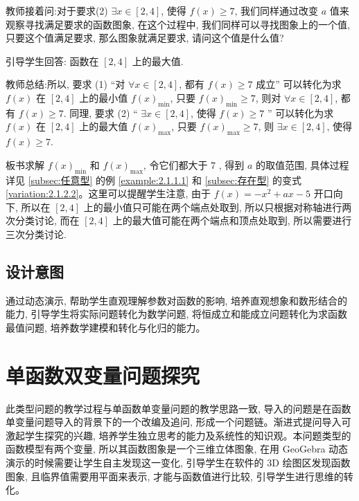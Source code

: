 教师接着问:对于要求(2) \(\exists x \in  \left\lbrack  {2, 4}\right\rbrack\), 使得 \(f(x)  \geq  7\), 我们同样通过改变 \(a\) 值来观察寻找满足要求的函数图象, 在这个过程中, 我们同样可以寻找图象上的一个值, 只要这个值满足要求, 那么图象就满足要求, 请问这个值是什么值?

引导学生回答: 函数在 \(\left\lbrack  {2, 4}\right\rbrack\) 上的最大值.

教师总结:所以, 要求 (1) “对 \(\forall x \in  \left\lbrack  {2, 4}\right\rbrack\), 都有 \(f(x)  \geq  7\) 成立” 可以转化为求 \(f(x)\) 在 \(\left\lbrack  {2, 4}\right\rbrack\) 上的最小值 \(f{(x) }_{\min }\), 只要 \(f{(x) }_{\min } \geq  7\), 则对 \(\forall x \in  \left\lbrack  {2, 4}\right\rbrack\), 都有 \(f(x)  \geq  7\). 同理, 要求 (2) “ \(\exists x \in  \left\lbrack  {2, 4}\right\rbrack\), 使得 \(f(x)  \geq  7\) ” 可以转化为求 \(f(x)\) 在 \(\left\lbrack  {2, 4}\right\rbrack\) 上的最大值 \(f{(x) }_{\max }\), 只要 \(f{(x) }_{\max } \geq  7\), 则 \(\exists x \in  \left\lbrack  {2, 4}\right\rbrack\), 使得 \(f(x)  \geq  7\).

板书求解 \(f{(x) }_{\min }\) 和 \(f{(x) }_{\max }\), 令它们都大于 7 , 得到 \(a\) 的取值范围, 具体过程详见 \ref{subsec:任意型} 的例 \ref{example:2.1.1.1} 和 \ref{subsec:存在型} 的变式 \ref{variation:2.1.2.2}。这里可以提醒学生注意, 由于 \(f(x)  =  - {x}^{2} + {ax} - 5\) 开口向下, 所以在 \(\left\lbrack  {2, 4}\right\rbrack\) 上的最小值只可能在两个端点处取到, 所以只根据对称轴进行两次分类讨论, 而在 \(\left\lbrack  {2, 4}\right\rbrack\) 上的最大值可能在两个端点和顶点处取到, 所以需要进行三次分类讨论.


\subsection{设计意图}
通过动态演示, 帮助学生直观理解参数对函数的影响, 培养直观想象和数形结合的能力, 引导学生将实际问题转化为数学问题, 将恒成立和能成立问题转化为求函数最值问题, 培养数学建模和转化与化归的能力。


\section{单函数双变量问题探究}
此类型问题的教学过程与单函数单变量问题的教学思路一致, 导入的问题是在函数单变量问题导入的背景下的一个改编及追问, 形成一个问题链。渐进式提问导入可激起学生探究的兴趣, 培养学生独立思考的能力及系统性的知识观。本问题类型的函数模型有两个变量, 所以其函数图象是一个三维立体图象, 在用 GeoGebra 动态演示的时候需要让学生自主发现这一变化, 引导学生在软件的 3D 绘图区发现函数图象, 且临界值需要用平面来表示, 才能与函数值进行比较, 引导学生进行思维的转化。


